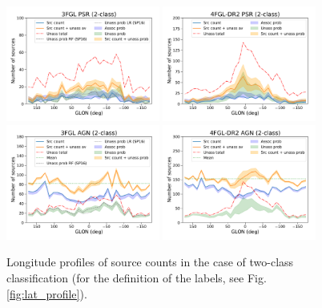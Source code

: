 \documentclass[referee]{aa} %
\begin{document}
\begin{figure}[h]
\centering
\includegraphics[width=0.45\textwidth]{plots/lon_profile_PSR_3FGL_2classes.pdf}
\includegraphics[width=0.45\textwidth]{plots/lon_profile_PSR_4FGL-DR2_2classes.pdf} \\
\includegraphics[width=0.45\textwidth]{plots/lon_profile_AGN_3FGL_2classes.pdf}
\includegraphics[width=0.45\textwidth]{plots/lon_profile_AGN_4FGL-DR2_2classes.pdf}
\caption{Longitude profiles of source counts in the case of two-class classification (for the definition of the labels, see Fig. \ref{fig:lat_profile}).}  
\label{fig:lon_profile}
\end{figure}
\end{document}
